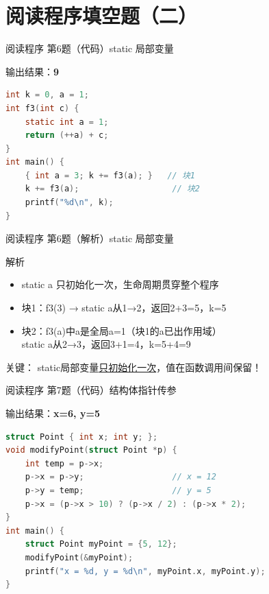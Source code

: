 \section{阅读程序填空题（二）}

\begin{frame}[fragile]{阅读程序 第6题（代码）}{static 局部变量}
    \begin{exampleblock}{输出结果：\textbf{9}}
    \end{exampleblock}
    \begin{lstlisting}[language=C]
int k = 0, a = 1;
int f3(int c) {
    static int a = 1;
    return (++a) + c;
}
int main() {
    { int a = 3; k += f3(a); }   // 块1
    k += f3(a);                   // 块2
    printf("%d\n", k);
}
\end{lstlisting}
\end{frame}

\begin{frame}{阅读程序 第6题（解析）}{static 局部变量}
    \begin{alertblock}{解析}
        \footnotesize
        \begin{itemize}
            \setlength{\itemsep}{0pt}
            \item static a 只初始化一次，生命周期贯穿整个程序
            \item 块1：f3(3) → static a从1→2，返回2+3=5，k=5
            \item 块2：f3(a)中a是全局a=1（块1的a已出作用域）\\
            static a从2→3，返回3+1=4，k=5+4=9
        \end{itemize}
        {\color{highlight}关键：} static局部变量\underline{只初始化一次}，值在函数调用间保留！
    \end{alertblock}
\end{frame}

\begin{frame}[fragile]{阅读程序 第7题（代码）}{结构体指针传参}
    \begin{exampleblock}{输出结果：\textbf{x=6, y=5}}
    \end{exampleblock}
    \begin{lstlisting}[language=C]
struct Point { int x; int y; };
void modifyPoint(struct Point *p) {
    int temp = p->x;
    p->x = p->y;                  // x = 12
    p->y = temp;                  // y = 5
    p->x = (p->x > 10) ? (p->x / 2) : (p->x * 2);
}
int main() {
    struct Point myPoint = {5, 12};
    modifyPoint(&myPoint);
    printf("x = %d, y = %d\n", myPoint.x, myPoint.y);
}
\end{lstlisting}
\end{frame}

